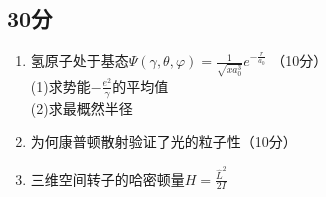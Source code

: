
\subsection{30分}
\begin{enumerate}
\item 氢原子处于基态$\varPsi(\gamma,\theta,\varphi)=\frac{1}{\sqrt{xa^{3}_{0}}}e^{-\frac{r}{a_0}}$ （10分）\\
(1)求势能$-\frac{e^2}{\gamma}$的平均值\\
(2)求最概然半径\\
\item 为何康普顿散射验证了光的粒子性（10分）\\
\item 三维空间转子的哈密顿量$H=\frac{\hat L^2}{2I}$
\end{enumerate}